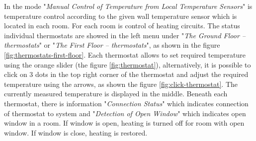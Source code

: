 \begin{English}
\end{English}

\begin{Czech}
\end{Czech}


\begin{English}
\end{English}

\begin{Czech}
\end{Czech}


\begin{English}
In the mode "\textit{Manual Control of Temperature from Local Temperature Sensors}" is temperature control according to the given wall temperature sensor which is located in each room. For each room is control of heating circuits. The status individual thermostats are showed in the left menu under "\textit{The Ground Floor – thermostats}" or "\textit{The First Floor – thermostats}", as shown in the figure \ref{fig:thermostats-first-floor}. Each thermostat allows to set required temperature  using the orange slider (the figure \ref{fig:thermostat}), alternatively, it is possible to click on 3 dots in the top right corner of the thermostat and adjust the required temperature using the arrows, as shown the figure \ref{fig:click-thermostat}. The currently measured temperature is displayed in the middle. Beneath each thermostat, there is information "\textit{Connection Status}" which indicates connection of thermostat to system and "\textit{Detection of Open Window}" which indicates open window in a room. If window is open, heating is turned off for room with open window. If window is close, heating is restored.
\end{English}

